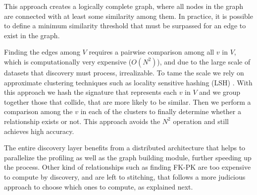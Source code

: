 This approach creates a logically complete graph, where all nodes in the graph
are connected with at least some similarity among them. In practice, it is
possible to define a minimum similarity threshold that must be surpassed for an
edge to exist in the graph.

Finding the edges among $V$ requires a pairwise comparison among all $v$ in $V$,
which is computationally very expensive ($O(N^2)$), and due to the large scale
of datasets that discovery must process, irrealizable. To tame the scale we rely
on approximate clustering techniques such as locality sensitive hashing (LSH)
\cite{DBLP:conf/compgeom/DatarIIM04}. With this approach we hash the signature
that represents each $v$ in $V$ and we group together those that collide, \ie
that are more likely to be similar. Then we perform a comparison among the $v$
in each of the clusters to finally determine whether a relationship exists or
not. This approach avoids the $N^2$ operation and still achieves high accuracy.

The entire discovery layer benefits from a distributed architecture that helps
to parallelize the profiling as well as the graph building module, further
speeding up the process. Other kind of relationships such as finding FK-PK are
too expensive to compute by discovery, and are left to stitching, that follows a
more judicious approach to choose which ones to compute, as explained next.


